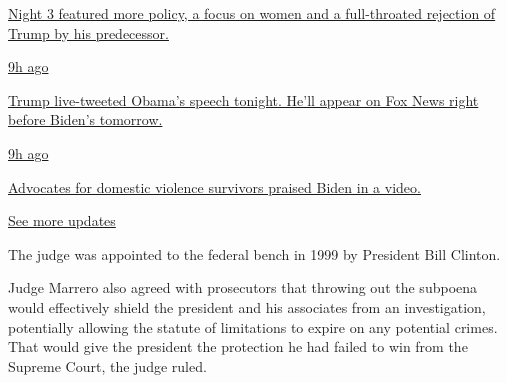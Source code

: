 \href{https://www.nytimes3xbfgragh.onion/live/2020/08/19/us/dnc-convention-election?action=click\&pgtype=Article\&state=default\&region=MAIN_CONTENT_1\&context=storylines_live_updates\#night-3-featured-more-policy-a-focus-on-women-and-a-full-throated-rejection-of-trump-by-his-predecessor}{Night
3 featured more policy, a focus on women and a full-throated rejection
of Trump by his predecessor.}

\href{https://www.nytimes3xbfgragh.onion/live/2020/08/19/us/dnc-convention-election?action=click\&pgtype=Article\&state=default\&region=MAIN_CONTENT_1\&context=storylines_live_updates\#trump-live-tweeted-obamas-speech-tonight-hell-appear-on-fox-news-right-before-bidens-tomorrow}{9h
ago}

\href{https://www.nytimes3xbfgragh.onion/live/2020/08/19/us/dnc-convention-election?action=click\&pgtype=Article\&state=default\&region=MAIN_CONTENT_1\&context=storylines_live_updates\#trump-live-tweeted-obamas-speech-tonight-hell-appear-on-fox-news-right-before-bidens-tomorrow}{Trump
live-tweeted Obama's speech tonight. He'll appear on Fox News right
before Biden's tomorrow.}

\href{https://www.nytimes3xbfgragh.onion/live/2020/08/19/us/dnc-convention-election?action=click\&pgtype=Article\&state=default\&region=MAIN_CONTENT_1\&context=storylines_live_updates\#advocates-for-domestic-violence-survivors-praised-biden-in-a-video}{9h
ago}

\href{https://www.nytimes3xbfgragh.onion/live/2020/08/19/us/dnc-convention-election?action=click\&pgtype=Article\&state=default\&region=MAIN_CONTENT_1\&context=storylines_live_updates\#advocates-for-domestic-violence-survivors-praised-biden-in-a-video}{Advocates
for domestic violence survivors praised Biden in a video.}

\href{https://www.nytimes3xbfgragh.onion/live/2020/08/19/us/dnc-convention-election?action=click\&pgtype=Article\&state=default\&region=MAIN_CONTENT_1\&context=storylines_live_updates}{See
more updates}

The judge was appointed to the federal bench in 1999 by President Bill
Clinton.

Judge Marrero also agreed with prosecutors that throwing out the
subpoena would effectively shield the president and his associates from
an investigation, potentially allowing the statute of limitations to
expire on any potential crimes. That would give the president the
protection he had failed to win from the Supreme Court, the judge ruled.


